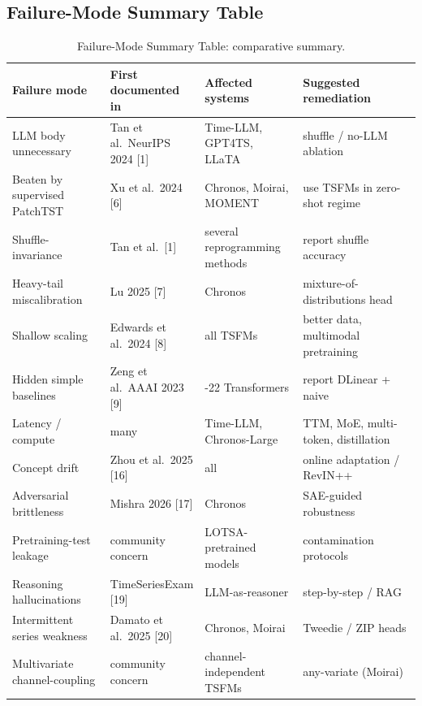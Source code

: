 \documentclass{article}
\begin{document}
\subsection{Failure-Mode Summary Table}\label{failure-mode-summary-table}

\begin{table}[t]
\centering
\caption{Failure-Mode Summary Table: comparative summary.}
\label{tab:failure-mode-summary-table}
\begin{tabular}{>{\raggedright\arraybackslash}p{0.2417\linewidth}
  >{\raggedright\arraybackslash}p{0.2250\linewidth}
  >{\raggedright\arraybackslash}p{0.2417\linewidth}
  >{\raggedright\arraybackslash}p{0.2917\linewidth}}
\toprule
Failure mode & First documented in & Affected systems & Suggested remediation \\
\midrule
LLM body unnecessary & Tan et al.~NeurIPS 2024 {[}1{]} & Time-LLM, GPT4TS, LLaTA & shuffle / no-LLM ablation \\
Beaten by supervised PatchTST & Xu et al.~2024 {[}6{]} & Chronos, Moirai, MOMENT & use TSFMs in zero-shot regime \\
Shuffle-invariance & Tan et al.~{[}1{]} & several reprogramming methods & report shuffle accuracy \\
Heavy-tail miscalibration & Lu 2025 {[}7{]} & Chronos & mixture-of-distributions head \\
Shallow scaling & Edwards et al.~2024 {[}8{]} & all TSFMs & better data, multimodal pretraining \\
Hidden simple baselines & Zeng et al.~AAAI 2023 {[}9{]} & 2021-22 Transformers & report DLinear + naive \\
Latency / compute & many & Time-LLM, Chronos-Large & TTM, MoE, multi-token, distillation \\
Concept drift & Zhou et al.~2025 {[}16{]} & all & online adaptation / RevIN++ \\
Adversarial brittleness & Mishra 2026 {[}17{]} & Chronos & SAE-guided robustness \\
Pretraining-test leakage & community concern & LOTSA-pretrained models & contamination protocols \\
Reasoning hallucinations & TimeSeriesExam {[}19{]} & LLM-as-reasoner & step-by-step / RAG \\
Intermittent series weakness & Damato et al.~2025 {[}20{]} & Chronos, Moirai & Tweedie / ZIP heads \\
Multivariate channel-coupling & community concern & channel-independent TSFMs & any-variate (Moirai) \\
\end{tabular}
\end{table}
\end{document}
